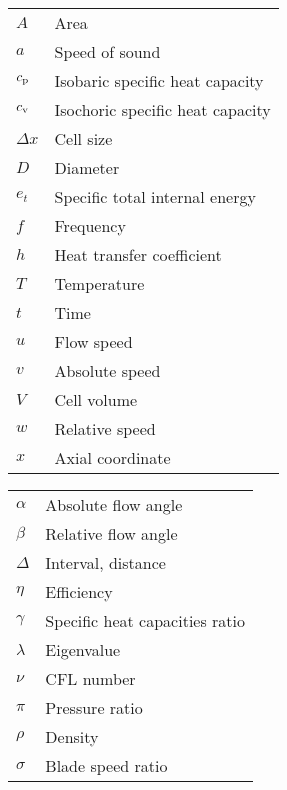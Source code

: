 
\par
\vspace{1cm}
\begin{table}[H]
  \begin{tabular}{@{}ll} %
      $A$ & Area \\
      $a$ & Speed of sound \\
      $c_\textnormal{p}$ & Isobaric specific heat capacity \\
      $c_\textnormal{v}$ & Isochoric specific heat capacity \\
      $\Delta x$ & Cell size \\
      $D$ & Diameter \\
      $e_t$ & Specific total internal energy \\
      $f$ & Frequency \\
      $h$ & Heat transfer coefficient \\
      $T$ & Temperature \\
      $t$ & Time \\
      $u$ & Flow speed \\
      $v$ & Absolute speed \\
      $V$ & Cell volume \\
      $w$ & Relative speed \\
      $x$ & Axial coordinate \\
  \end{tabular}
\end{table}

\begin{longtable}[l]{ll} %
  $\alpha$ & Absolute flow angle \\
  $\beta$ & Relative flow angle \\
  $\Delta$ & Interval, distance \\
  $\eta$ & Efficiency \\
  $\gamma$ & Specific heat capacities ratio \\
  $\lambda$ & Eigenvalue \\
  $\nu$ & CFL number \\
  $\pi$ & Pressure ratio \\
  $\rho$ & Density \\
  $\sigma$ & Blade speed ratio \\
\end{longtable}

